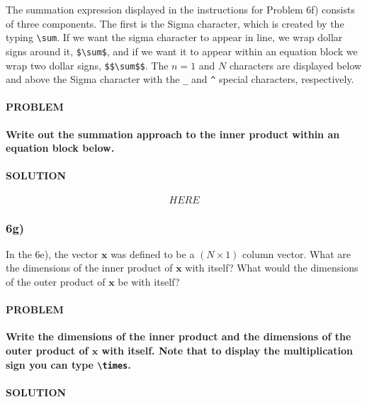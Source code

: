 \documentclass[]{article}
\let\oldparagraph\paragraph
\renewcommand{\paragraph}[1]{\oldparagraph{#1}\mbox{}}
\begin{document}
The summation expression displayed in the instructions for Problem 6f)
consists of three components. The first is the Sigma character, which is
created by the typing \texttt{\textbackslash{}sum}. If we want the sigma
character to appear in line, we wrap dollar signs around it,
\texttt{\$\textbackslash{}sum\$}, and if we want it to appear within an
equation block we wrap two dollar signs,
\texttt{\$\$\textbackslash{}sum\$\$}. The \(n=1\) and \(N\) characters
are displayed below and above the Sigma character with the \texttt{\_}
and \texttt{\^{}} special characters, respectively.

\hypertarget{problem-36}{%
\paragraph{PROBLEM}\label{problem-36}}

\textbf{Write out the summation approach to the inner product within an
equation block below.}

\hypertarget{solution-35}{%
\paragraph{SOLUTION}\label{solution-35}}

\[ 
HERE
\]

\hypertarget{g-2}{%
\subsubsection{6g)}\label{g-2}}

In the 6e), the vector \(\mathbf{x}\) was defined to be a
\(\left(N \times 1 \right)\) column vector. What are the dimensions of
the inner product of \(\mathbf{x}\) with itself? What would the
dimensions of the outer product of \(\mathbf{x}\) be with itself?

\hypertarget{problem-37}{%
\paragraph{PROBLEM}\label{problem-37}}

\textbf{Write the dimensions of the inner product and the dimensions of
the outer product of \(\mathbf{x}\) with itself. Note that to display
the multiplication sign you can type \texttt{\textbackslash{}times}.}

\hypertarget{solution-36}{%
\paragraph{SOLUTION}\label{solution-36}}
\end{document}
